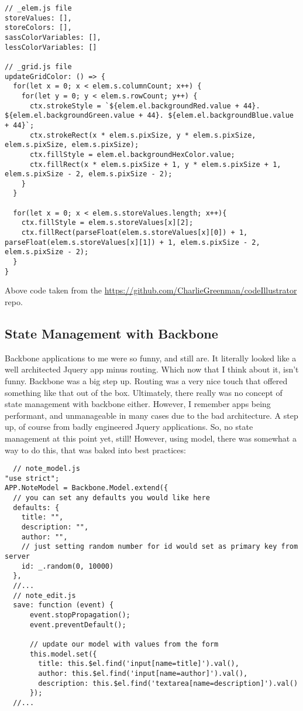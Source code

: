 \begin{lstlisting}
// _elem.js file
storeValues: [],
storeColors: [],
sassColorVariables: [],
lessColorVariables: []

// _grid.js file
updateGridColor: () => {
  for(let x = 0; x < elem.s.columnCount; x++) {
    for(let y = 0; y < elem.s.rowCount; y++) {
      ctx.strokeStyle = `${elem.el.backgroundRed.value + 44}. ${elem.el.backgroundGreen.value + 44}. ${elem.el.backgroundBlue.value + 44}`;
      ctx.strokeRect(x * elem.s.pixSize, y * elem.s.pixSize, elem.s.pixSize, elem.s.pixSize);
      ctx.fillStyle = elem.el.backgroundHexColor.value;
      ctx.fillRect(x * elem.s.pixSize + 1, y * elem.s.pixSize + 1, elem.s.pixSize - 2, elem.s.pixSize - 2);
    }
  }

  for(let x = 0; x < elem.s.storeValues.length; x++){
    ctx.fillStyle = elem.s.storeValues[x][2];
    ctx.fillRect(parseFloat(elem.s.storeValues[x][0]) + 1, parseFloat(elem.s.storeValues[x][1]) + 1, elem.s.pixSize - 2, elem.s.pixSize - 2);
  }
}

\end{lstlisting}
Above code taken from the \href{codeIllustrator}{https://github.com/CharlieGreenman/codeIllustrator} repo.

\subsection{ State Management with Backbone }
Backbone applications to me were so funny, and still are. It literally looked
like a well architected Jquery app minus routing. Which now that I think about
it, isn't funny. Backbone was a big step up. Routing was a very nice touch that
offered something like that out of the box. Ultimately, there really was no
concept of state management with backbone either. However, I remember apps being
performant, and unmanageable in many cases due to the bad architecture. A step
up, of course from badly engineered Jquery applications. So, no state management
at this point yet, still! However, using model, there was somewhat a way to do
this, that was baked into best practices:

\begin{lstlisting}
  // note_model.js
"use strict";
APP.NoteModel = Backbone.Model.extend({
  // you can set any defaults you would like here
  defaults: {
    title: "",
    description: "",
    author: "",
    // just setting random number for id would set as primary key from server
    id: _.random(0, 10000)
  },
  //...
  // note_edit.js
  save: function (event) {
      event.stopPropagation();
      event.preventDefault();

      // update our model with values from the form
      this.model.set({
        title: this.$el.find('input[name=title]').val(),
        author: this.$el.find('input[name=author]').val(),
        description: this.$el.find('textarea[name=description]').val()
      });
  //...

\end{lstlisting}

